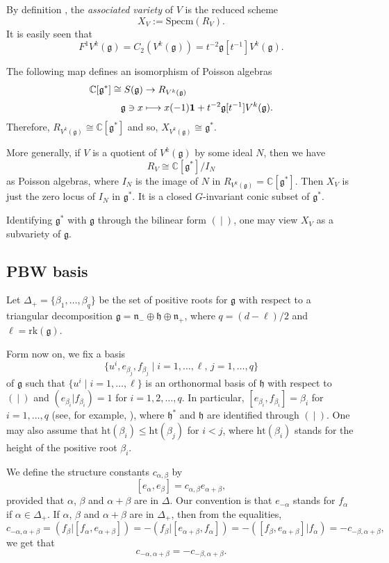 \documentclass[JEP,XML,SOM,Unicode]{cedram}
\newcommand\mto{\mathchoice{\longmapsto}{\mapsto}{\mapsto}{\mapsto}}
\let\al\alpha
\let\be\beta
\newcommand\C{{\mathbb C}}
\newcommand \g{\mathfrak g}
\newcommand \h{\mathfrak{h}}
\theoremstyle{definition}
\begin{document}
By definition \cite{Ara12}, the
\emph{associated variety} of $V$
is
the reduced scheme
\[
X_V:= \mathrm{Specm}(R_V).
\]
It is easily seen that
\[
F^1 V^k(\g) = C_2(V^k(\g)) = t^{-2} \g[t^{-1}] V^k(\g).
\]

The following map defines an isomorphism of Poisson algebras
\begin{align*}
\C[\g^*] \cong S(\g) & \to R_{V^k(\g)} \\[0.2em]
\g \ni x & \mto x (-1) \mathbf{1}
+ t^{-2} \g[t^{-1}] V^k(\g).
\end{align*}
Therefore, $R_{V^k(\g)} \cong \C[\g^*]$ and so, $
X_{V^k(\g)}\cong \g^*$.

More generally, if $V$ is a quotient of $V^k(\g)$
by some ideal $N$, then
we have
\begin{equation}
R_{V}\cong \C[\g^*]/I_N
\end{equation}
as Poisson algebras,
where $I_N$ is the image of $N$ in $R_{V^k(\g)}=\C[\g^*]$.
Then $X_V$ is just the zero locus of $I_N$ in
$\g^*$.
It is a closed $G$-invariant conic subset of $\g^*$.

Identifying $\g^*$ with $\g$ through the bilinear form $(~|~)$,
one may view $X_V$ as a subvariety of $\g$.

\subsection{PBW basis}
Let ${\Delta}_{+}=\{\be_1,\dots,\be_q\}$ be the set of positive roots for $\g$ with respect
to a triangular decomposition
$\g= \mathfrak{n}_- \oplus \mathfrak{h} \oplus \mathfrak{n}_+$,
where $q=(d-\ell)/2$ and $\ell=\mathrm{rk}(\g)$.

Form now on, we
fix a basis
\[
\{u^i, e_{\be_j}, f_{\be_j}\mid i=1,\dots,\ell, \, j=1,\dots, q\}
\]
of $\g$ such that $\{u^{i} \mid i=1,\dots,\ell\}$
is an orthonormal basis of $\h$ with respect to $(~|~)$ and
$(e_{\be_i}|f_{\be_i})=1$ for $i=1,2,\dots,q$.
In particular, $[e_{\be_i}, f_{\be_i}]= \be_i$
for $i=1,\dots,q$ (see, for example, \cite[Prop.\,8.3]{Hu72}),
where $\h^*$ and $\h$ are identified through $(~|~)$.
One may also assume that $\mathrm{ht}(\be_i)\leq \mathrm{ht}(\be_j)$ for $i< j$,
where $\mathrm{ht}(\be_i)$ stands for the height of the positive root $\be_i$.

We define the structure constants $c_{\al,\be}$ by
\[
[e_\al,e_{\be}] = c_{\al,\be} e_{\al+\be},
\]
provided that $\al$, $\be$ and $\al+\be$ are in $\Delta$.
Our convention is that $e_{-\al}$ stands for $f_\al$ if $\alpha \in \Delta_+$.
If $\al$, $\be$ and $\al+\be$ are in $\Delta_+$,
then from the equalities,
\begin{equation*}
c_{-\al,\al+\be} = (f_{\be} | [f_{\al},e_{\al+\be}]) = - (f_{\be} | [e_{\al+\be},f_{\al}])
= - ([f_{\be}, e_{\al+\be}]|f_{\al}) = - c_{-\be,\al+\be},
\end{equation*}
we get that
\begin{equation}
\label{eq:structure_constant}
c_{-\al,\al+\be}= - c_{-\be,\al+\be}.
\end{equation}
\end{document}
